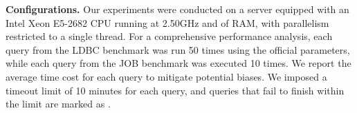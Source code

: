 
\noindent\textbf{Configurations. }
Our experiments were conducted on a server equipped with an Intel Xeon E5-2682 CPU running at 2.50GHz and  of RAM, with parallelism restricted to a single thread.
For a comprehensive performance analysis, each query from the LDBC benchmark was run 50 times using the official parameters, while each query from the JOB benchmark was executed 10 times. We report the average time cost for each query to mitigate potential biases.
We imposed a timeout limit of 10 minutes for each query, and queries that fail to finish within the limit are marked as \ot.

